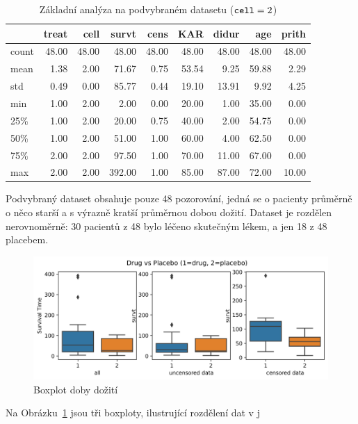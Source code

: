 \documentclass[a4, 11pt]{article}
\theoremstyle{definition}
\theoremstyle{remark}
\begin{document}
\begin{table}[H]
	\centering
	\label{tab:analyza_muj_dataset}
	\begin{tabular}{lrrrrrrrr}
		\toprule
		& treat & cell & survt & cens & KAR & didur & age & prith \\
		\midrule
		count & 48.00 & 48.00 & 48.00 & 48.00 & 48.00 & 48.00 & 48.00 & 48.00 \\
		mean & 1.38 & 2.00 & 71.67 & 0.75 & 53.54 & 9.25 & 59.88 & 2.29 \\
		std & 0.49 & 0.00 & 85.77 & 0.44 & 19.10 & 13.91 & 9.92 & 4.25 \\
		min & 1.00 & 2.00 & 2.00 & 0.00 & 20.00 & 1.00 & 35.00 & 0.00 \\
		25\% & 1.00 & 2.00 & 20.00 & 0.75 & 40.00 & 2.00 & 54.75 & 0.00 \\
		50\% & 1.00 & 2.00 & 51.00 & 1.00 & 60.00 & 4.00 & 62.50 & 0.00 \\
		75\% & 2.00 & 2.00 & 97.50 & 1.00 & 70.00 & 11.00 & 67.00 & 0.00 \\
		max & 2.00 & 2.00 & 392.00 & 1.00 & 85.00 & 87.00 & 72.00 & 10.00 \\
		\bottomrule
	\end{tabular}
	\caption{Základní analýza na podvybraném datasetu ($\mbox{\texttt{cell}}=2$)}
\end{table}
	
	Podvybraný dataset obsahuje pouze 48 pozorování, jedná se o pacienty průměrně o něco starší a s výrazně kratší průměrnou dobou dožití. Dataset je rozdělen nerovnoměrně: 30 pacientů z 48 bylo léčeno skutečným lékem, a jen 18 z 48 placebem. 
	
	\begin{figure}[H]
		\centering
		\includegraphics[width=0.999\linewidth]{img/boxplot_drug_vs_placebo_BOTH}
		\caption[Boxplot doby dožití]{Boxplot doby dožití}
		\label{fig:boxplotdrugvsplacebo}
	\end{figure}

	Na Obrázku~\ref{fig:boxplotdrugvsplacebo} jsou tři boxploty, ilustrující rozdělení dat v j
	
\end{document}
